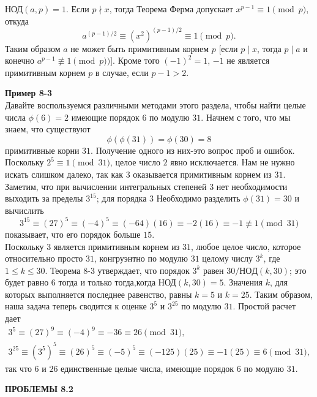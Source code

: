 \documentclass[11pt]{article}
\begin{document}
\noindent $\text{НОД}(a,p)=1.$ Если $p \nmid x$, тогда Теорема Ферма допускает $x^{p-1} \equiv 1 \pmod{p}$, откуда
\begin{equation*}
    a^{{(p-1)}/2} \equiv (x^2)^{(p-1)/2} \equiv 1 \pmod{p}.
\end{equation*}
Таким образом $a$ не может быть примитивным корнем $p$ [если $p \mid x$, тогда $p \mid a$ и конечно $a^{p-1} \not\equiv 1 \pmod{p})$]. Кроме того $(-1)^2=1$, $-1$ не является примитивным корнем $p$ в случае, если $p-1>2$. 

\noindent \textbf{Пример 8-3} \\
Давайте воспользуемся различными методами этого раздела, чтобы найти целые числа $\phi(6)=2$ имеющие порядок $6$ по модулю $31$. Начнем с того, что мы знаем, что существуют
\begin{equation*}
    \phi(\phi(31))=\phi(30)=8
\end{equation*}
примитивные корни $31$. Получение одного из них-это вопрос проб и ошибок. Поскольку $2^5 \equiv 1 \pmod{31}$, целое число $2$ явно исключается. Нам не нужно искать слишком далеко, так как $3$ оказывается примитивным корнем из $31$. Заметим, что при вычислении интегральных степеней $3$ нет необходимости выходить за пределы $3^{15}$; для порядка $3$ Необходимо разделить $\phi(31)=30$ и вычислить
\begin{equation*}
    3^{15} \equiv (27)^5 \equiv (-4)^5 \equiv (-64)(16) \equiv -2(16) \equiv -1 \not\equiv 1 \pmod{31}
\end{equation*}
показывает, что его порядок больше $15$. \\
Поскольку $3$ является примитивным корнем из $31$, любое целое число, которое относительно просто $31$, конгруэнтно по модулю $31$ целому числу $3^k$, где $1 \leqslant k \leqslant 30$. Теорема 8-3 утверждает, что порядок $3^k$ равен $30/НОД(k,30)$; это будет равно $6$ тогда и только тогда,когда $\text{НОД} (k, 30)=5$. Значения $k$, для которых выполняется последнее равенство, равны $k=5$ и $k=25$. Таким образом, наша задача теперь сводится к оценке $3^5$ и $3^{25}$ по модулю $31$. Простой расчет дает
\begin{gather*}
    3^5 \equiv (27)^9 \equiv (-4)^9 \equiv -36 \equiv 26 \pmod{31}, \\
    3^{25} \equiv (3^5)^5 \equiv (26)^5 \equiv (-5)^5 \equiv (-125)(25) \equiv -1(25) \equiv 6 \pmod{31},
\end{gather*}
так что $6$ и $26$ единственные целые числа, имеющие порядок $6$ по модулю $31$. \\
\begin{center}
    {\bf ПРОБЛЕМЫ 8.2}
\end{center}
\end{document}
